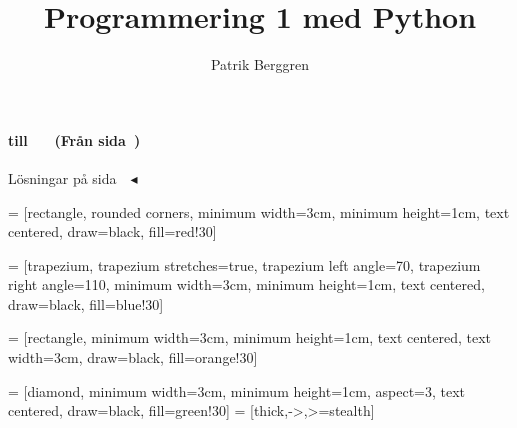 \title{Programmering 1 med Python}
\author{Patrik Berggren}

\hypersetup{colorlinks}

  {\section{}}

  {%
    \IfInsideSolutionTF
      {\label{sol:\ExerciseID}}
      {\label{ex:\ExerciseID}}%
    \paragraph*
      {%
        \XSIMmixedcase{\GetExerciseName}%
        \IfInsideSolutionTF
          {
            till %
            ~%
            ~(Från sida~\pageref{ex:\ExerciseID})
          }
          {%
            ~%
          }
      }
      \noindent
  }
  {%
    \IfInsideSolutionF
      {\par\leavevmode\hfill
       Lösningar på sida~\pageref{sol:\ExerciseID}~$\blacktriangleleft$}%
  }




\usepackage{tikz}
\usetikzlibrary{shapes.geometric, arrows}

 = [rectangle, rounded corners, 
minimum width=3cm, 
minimum height=1cm,
text centered, 
draw=black, 
fill=red!30]

 = [trapezium, 
trapezium stretches=true, %
trapezium left angle=70, 
trapezium right angle=110, 
minimum width=3cm, 
minimum height=1cm, text centered, 
draw=black, fill=blue!30]

 = [rectangle, 
minimum width=3cm, 
minimum height=1cm, 
text centered, 
text width=3cm, 
draw=black, 
fill=orange!30]

 = [diamond, 
minimum width=3cm, 
minimum height=1cm,
aspect=3,
text centered, 
draw=black, 
fill=green!30]
 = [thick,->,>=stealth]